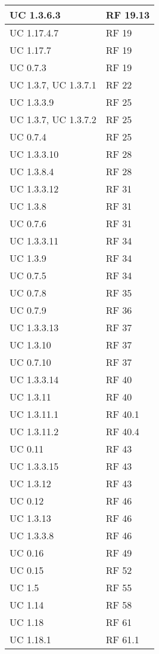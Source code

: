 {\begin{longtable} [c]{| p{4cm} | p{4cm} |}
 \hline 
UC 1.3.6.3 & RF 19.13\\ 
 \hline 
UC 1.17.4.7 & RF 19\\ 
 \hline 
UC 1.17.7 & RF 19\\ 
 \hline 
UC 0.7.3 & RF 19\\ 
 \hline 
UC 1.3.7, UC 1.3.7.1 & RF 22\\ 
 \hline 
UC 1.3.3.9 & RF 25\\ 
 \hline 
UC 1.3.7, UC 1.3.7.2 & RF 25\\ 
 \hline 
UC 0.7.4 & RF 25\\ 
 \hline 
UC 1.3.3.10 & RF 28\\ 
 \hline 
UC 1.3.8.4 & RF 28\\ 
 \hline 
UC 1.3.3.12 & RF 31\\ 
 \hline 
UC 1.3.8 & RF 31\\ 
 \hline 
UC 0.7.6 & RF 31\\ 
 \hline 
UC 1.3.3.11 & RF 34\\ 
 \hline 
UC 1.3.9 & RF 34\\ 
 \hline 
UC 0.7.5 & RF 34\\ 
 \hline 
UC 0.7.8 & RF 35\\ 
 \hline 
UC 0.7.9 & RF 36\\ 
 \hline 
UC 1.3.3.13 & RF 37\\ 
 \hline 
UC 1.3.10 & RF 37\\ 
 \hline 
UC 0.7.10 & RF 37\\ 
 \hline 
UC 1.3.3.14 & RF 40\\ 
 \hline 
UC 1.3.11 & RF 40\\ 
 \hline 
UC 1.3.11.1 & RF 40.1\\ 
 \hline 
UC 1.3.11.2 & RF 40.4\\ 
 \hline 
UC 0.11 & RF 43\\ 
 \hline 
UC 1.3.3.15 & RF 43\\ 
 \hline 
UC 1.3.12 & RF 43\\ 
 \hline 
UC 0.12 & RF 46\\ 
 \hline 
UC 1.3.13 & RF 46\\ 
 \hline 
UC 1.3.3.8 & RF 46\\ 
 \hline 
UC 0.16 & RF 49\\ 
 \hline 
UC 0.15 & RF 52\\ 
 \hline 
UC 1.5 & RF 55\\ 
 \hline 
UC 1.14 & RF 58\\ 
 \hline 
UC 1.18 & RF 61\\ 
 \hline 
UC 1.18.1 & RF 61.1\\ 

\end{longtable}}
